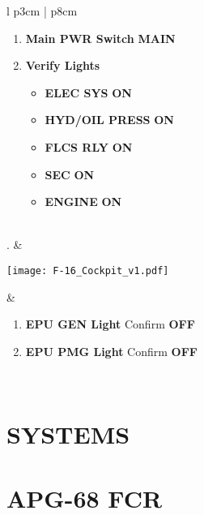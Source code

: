 \documentclass[fontHelvetica]{TechCheck}
\begin{document}
\begin{center}
\begin{longtable}{l p{3cm} | p{8cm}}
\begin{minipage}[t]{\linewidth}
				\vspace{-7pt}
				\begin{enumerate}
					\item \textbf{Main PWR Switch} \dotfill \textbf{MAIN}
					\item \textbf{Verify Lights}
					\begin{itemize}
						\item \textbf{ELEC SYS} \dotfill \textbf{ON}
						\item \textbf{HYD/OIL PRESS} \dotfill \textbf{ON}
						\item \textbf{FLCS RLY} \dotfill \textbf{ON}
						\item \textbf{SEC} \dotfill \textbf{ON}
						\item \textbf{ENGINE} \dotfill \textbf{ON}
					\end{itemize}
				\end{enumerate}
			\end{minipage} \\
			. & 
			\begin{minipage}[t]{\linewidth}
				\vspace{-7pt}
				\centering
				\texttt{[image: F-16\_Cockpit\_v1.pdf]}
			\end{minipage} &
			\begin{minipage}[t]{\linewidth}
				\vspace{-7pt}
				\begin{enumerate}
					\item \textbf{EPU GEN Light} \dotfill Confirm \textbf{OFF}
					\item \textbf{EPU PMG Light} \dotfill Confirm \textbf{OFF}
				\end{enumerate}
			\end{minipage} \\
			\bottomrule
		\end{longtable}
	\end{center}
	\clearpage

	\cleardoublepage

	\chapter{SYSTEMS}
	\minitoc
	\cleardoublepage

	\cleardoublepage

	\chapter{APG-68 FCR}
	\minitoc
	\cleardoublepage
\end{document}
